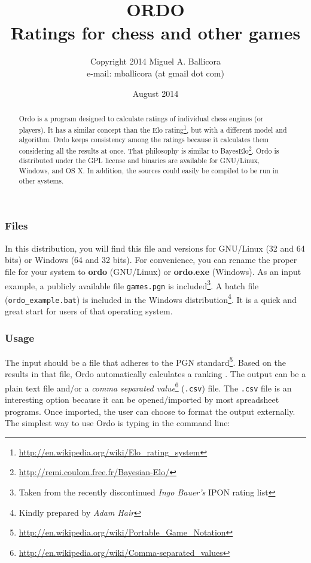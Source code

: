 \documentclass[12pt]{article}
\title{ORDO  \\ Ratings for chess and other games}
\author{Copyright \cpyrht{} 2014 Miguel A. Ballicora\\e-mail: mballicora (at gmail dot com)}
\date{August 2014}
\newcommand{\rgstrd} {\textsuperscript{\textregistered{}}}
\newcommand{\person} [1] {\textit{#1}}
\newcommand{\filename} [1] {\texttt{#1}}
\begin{document}
   \maketitle

\begin{abstract}
Ordo is a program designed to calculate ratings of individual chess engines (or players).
It has a similar concept than the Elo rating\footnote{\url{http://en.wikipedia.org/wiki/Elo_rating_system}}, but with a different model and algorithm. 
Ordo keeps consistency among the ratings because it calculates them considering all the results at once.
That philosophy is similar to BayesElo\footnote{\url{http://remi.coulom.free.fr/Bayesian-Elo/}}.
Ordo is distributed under the GPL license and binaries are available for GNU/Linux, Windows\rgstrd{}, and OS X.
In addition, the sources could easily be compiled to be run in other systems. 
\end{abstract}

\subsubsection*{Files}
In this distribution, you will find this file and versions for GNU/Linux (32 and 64 bits) or Windows\rgstrd{} (64 and 32 bits). 
For convenience, you can rename the proper file for your system to \textbf{ordo} (GNU/Linux) or \textbf{ordo.exe} (Windows\rgstrd{}). 
As an input example, a publicly available file \filename{games.pgn} is included\footnote{Taken from the recently discontinued \person{Ingo Bauer's} IPON rating list}. 
A batch file (\filename{ordo\_example.bat}) is included in the Windows\rgstrd{} distribution\footnote{Kindly prepared by \person{Adam Hair}}. 
It is a quick and great start for users of that operating system.

\subsubsection*{Usage}
The input should be a file that adheres to the PGN standard\footnote{\url{http://en.wikipedia.org/wiki/Portable_Game_Notation}}. 
Based on the results in that file, Ordo automatically calculates a ranking . 
The output can be a plain text file and/or a \textit{comma separated value}\footnote{\url{http://en.wikipedia.org/wiki/Comma-separated_values}} (\filename{.csv}) file.
The \filename{.csv} file is an interesting option because it can be opened/imported by most spreadsheet programs. 
Once imported, the user can choose to format the output externally.
The simplest way to use Ordo is typing in the command line:
\end{document}
